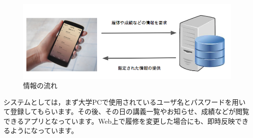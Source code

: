 \begin{figure}[h]
\includegraphics[scale = 0.5]{./nagare.png}
\caption{情報の流れ}
\label{flow}
\end{figure}

システムとしては，まず大学PCで使用されているユーザ名とパスワードを用いて登録してもらいます。その後、その日の講義一覧やお知らせ、成績などが閲覧できるアプリとなっています。Web上で履修を変更した場合にも、即時反映できるようになっています。
